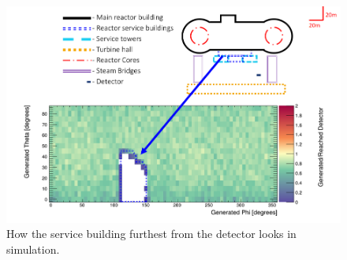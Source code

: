 
\newpage
\begin{figure}[htbp]
  \centering
  \begin{turn}{-90}
  \begin{minipage}{9in}
  \centering
    \includegraphics[scale = 0.8]{Chapter5/Figs/wylfaRasterNew/serviceBuildFar.png}
  \caption{How the service building furthest from the detector looks in simulation.}
  \label{fig:serviceBuildFar}
  \end{minipage}
  \end{turn}
\end{figure}


